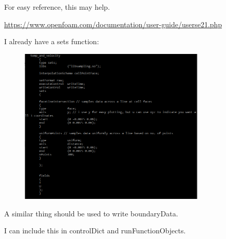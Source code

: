 \documentclass[12pt]{article}
\renewcommand{\_}{\kern-1.5pt\textunderscore\kern-1.5pt}
\begin{document}
For easy reference, this may help.\par

\href{https://www.openfoam.com/documentation/user-guide/userse21.php}{https://www.openfoam.com/documentation/user-guide/userse21.php}\par

I already have a sets function:\par




\begin{figure}[H]
	\begin{Center}
		\includegraphics[width=3.51in,height=2.94in]{./media/image27.png}
	\end{Center}
\end{figure}



\par

A similar thing should be used to write boundaryData.\par

I can include this in controlDict and runFunctionObjects.\par
\end{document}

